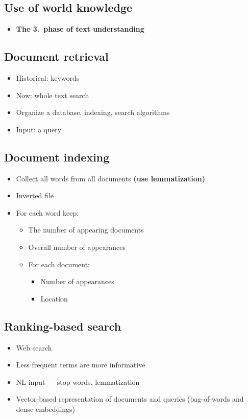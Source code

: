 \documentclass{article}
\begin{document}
    \subsection{Use of world knowledge}
    \begin{itemize}
        \item \textbf{The 3.\ phase of text understanding}
    \end{itemize}

    \subsection{Document retrieval}
    \begin{itemize}
        \item Historical: keywords
        \item Now: whole text search
        \item Organize a database, indexing, search algorithms
        \item Input: a query
    \end{itemize}

    \subsection{Document indexing}
    \begin{itemize}
        \item Collect all words from all documents \textbf{(use lemmatization)}
        \item Inverted file
        \item For each word keep:
        \begin{itemize}
            \item The number of appearing documents
            \item Overall number of appearances
            \item For each document:
            \begin{itemize}
                \item Number of appearances
                \item Location
            \end{itemize}
        \end{itemize}
    \end{itemize}

    \subsection{Ranking-based search}
    \begin{itemize}
        \item Web search
        \item Less frequent terms are more informative
        \item NL input --- stop words, lemmatization
        \item Vector-based representation of documents and queries (bag-of-words and dense embeddings)
    \end{itemize}
\end{document}
